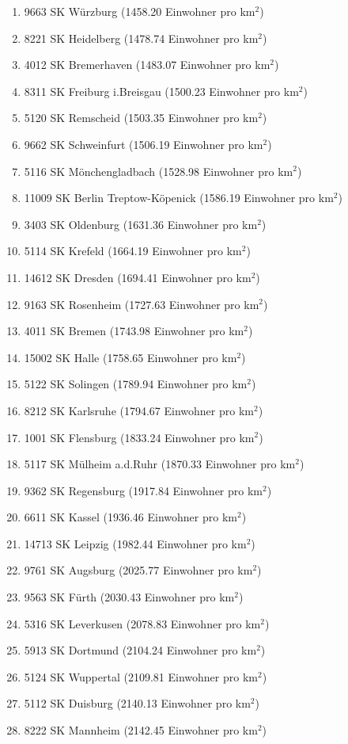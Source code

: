 \begin{enumerate}[itemsep=-6mm]
\item 9663 SK Würzburg (1458.20 Einwohner pro km$^2$)
\item 8221 SK Heidelberg (1478.74 Einwohner pro km$^2$)
\item 4012 SK Bremerhaven (1483.07 Einwohner pro km$^2$)
\item 8311 SK Freiburg i.Breisgau (1500.23 Einwohner pro km$^2$)
\item 5120 SK Remscheid (1503.35 Einwohner pro km$^2$)
\item 9662 SK Schweinfurt (1506.19 Einwohner pro km$^2$)
\item 5116 SK Mönchengladbach (1528.98 Einwohner pro km$^2$)
\item 11009 SK Berlin Treptow-Köpenick (1586.19 Einwohner pro km$^2$)
\item 3403 SK Oldenburg (1631.36 Einwohner pro km$^2$)
\item 5114 SK Krefeld (1664.19 Einwohner pro km$^2$)
\item 14612 SK Dresden (1694.41 Einwohner pro km$^2$)
\item 9163 SK Rosenheim (1727.63 Einwohner pro km$^2$)
\item 4011 SK Bremen (1743.98 Einwohner pro km$^2$)
\item 15002 SK Halle (1758.65 Einwohner pro km$^2$)
\item 5122 SK Solingen (1789.94 Einwohner pro km$^2$)
\item 8212 SK Karlsruhe (1794.67 Einwohner pro km$^2$)
\item 1001 SK Flensburg (1833.24 Einwohner pro km$^2$)
\item 5117 SK Mülheim a.d.Ruhr (1870.33 Einwohner pro km$^2$)
\item 9362 SK Regensburg (1917.84 Einwohner pro km$^2$)
\item 6611 SK Kassel (1936.46 Einwohner pro km$^2$)
\item 14713 SK Leipzig (1982.44 Einwohner pro km$^2$)
\item 9761 SK Augsburg (2025.77 Einwohner pro km$^2$)
\item 9563 SK Fürth (2030.43 Einwohner pro km$^2$)
\item 5316 SK Leverkusen (2078.83 Einwohner pro km$^2$)
\item 5913 SK Dortmund (2104.24 Einwohner pro km$^2$)
\item 5124 SK Wuppertal (2109.81 Einwohner pro km$^2$)
\item 5112 SK Duisburg (2140.13 Einwohner pro km$^2$)
\item 8222 SK Mannheim (2142.45 Einwohner pro km$^2$)

\end{enumerate}
